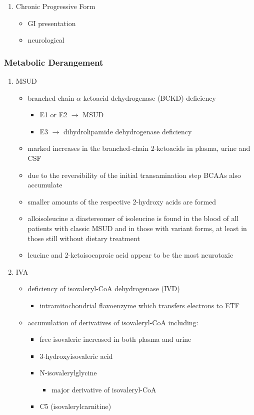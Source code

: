 \documentclass{scrartcl}
\begin{document}
\begin{enumerate}
\item Chronic Progressive Form
\label{sec:org172ee29}
\begin{itemize}
\item GI presentation
\item neurological
\end{itemize}
\end{enumerate}

\subsubsection{Metabolic Derangement}
\label{sec:org2f9d5a0}
\begin{enumerate}
\item MSUD
\label{sec:orgb8493ff}
\begin{itemize}
\item branched-chain \(\alpha\)-ketoacid dehydrogenase (BCKD) deficiency
\begin{itemize}
\item E1 or E2 \(\to\) MSUD
\item E3 \(\to\) dihydrolipamide dehydrogenase deficiency
\end{itemize}

\item marked increases in the branched-chain 2-ketoacids in plasma, urine
and CSF
\item due to the reversibility of the initial transamination step BCAAs
also accumulate
\item smaller amounts of the respective 2-hydroxy acids are formed
\item alloisoleucine a diastereomer of isoleucine is found in the blood of
all patients with classic MSUD and in those with variant forms, at
least in those still without dietary treatment
\item leucine and 2-ketoisocaproic acid appear to be the most neurotoxic
\end{itemize}

\item IVA
\label{sec:org9271c91}
\begin{itemize}
\item deficiency of isovaleryl-CoA dehydrogenase (IVD)
\begin{itemize}
\item intramitochondrial flavoenzyme which transfers electrons to ETF
\end{itemize}
\item accumulation of derivatives of isovaleryl-CoA including:
\begin{itemize}
\item free isovaleric increased in both plasma and urine
\item 3-hydroxyisovaleric acid
\item N-isovalerylglycine
\begin{itemize}
\item major derivative of isovaleryl-CoA
\end{itemize}
\item C5 (isovalerylcarnitine)
\end{itemize}
\end{itemize}


\end{enumerate}
\end{document}
